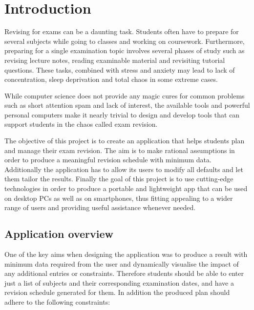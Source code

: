 \documentclass[bsc,frontabs,twoside,singlespacing,parskip]{infthesis}     %
\begin{document}



\tableofcontents



\chapter{Introduction}

	Revising for exams can be a daunting task. Students often have to prepare for several subjects while going to classes and working on coursework. Furthermore, preparing for a single examination topic involves several phases of study such as revising lecture notes, reading examinable material and revisiting tutorial questions. These tasks, combined with stress and anxiety may lead to lack of concentration, sleep deprivation and total chaos in some extreme cases.

	While computer science does not provide any magic cures for common problems such as short attention spam and lack of interest, the available tools and powerful personal computers make it nearly trivial to design and develop tools that can support students in the chaos called exam revision.

	The objective of this project is to create an application that helps students plan and manage their exam revision. The aim is to make rational assumptions in order to produce a meaningful revision schedule with minimum data. Additionally the application has to allow its users to modify all defaults and let them tailor the results. Finally the goal of this project is to use cutting-edge technologies in order to produce a portable and lightweight app that can be used on desktop PCs as well as on smartphones, thus fitting appealing to a wider range of users and providing useful assistance whenever needed.

	\section{Application overview}

		One of the key aims when designing the application was to produce a result with minimum data required from the user and dynamically visualise the impact of any additional entries or constraints. Therefore students should be able to enter just a list of subjects and their corresponding examination dates, and have a revision schedule generated for them. In addition the produced plan should adhere to the following constraints:
\end{document}
